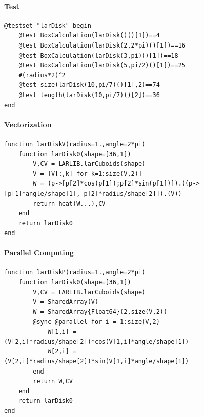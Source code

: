 \documentclass{article}
\begin{document}
\paragraph{Test}

\begin{Verbatim}
@testset "larDisk" begin
	@test BoxCalculation(larDisk()()[1])==4
	@test BoxCalculation(larDisk(2,2*pi)()[1])==16
	@test BoxCalculation(larDisk(3,pi)()[1])==18
	@test BoxCalculation(larDisk(5,pi/2)()[1])==25
	#(radius*2)^2
	@test size(larDisk(10,pi/7)()[1],2)==74
	@test length(larDisk(10,pi/7)()[2])==36
end
\end{Verbatim}

\paragraph{Vectorization}

\begin{verbatim}
function larDiskV(radius=1.,angle=2*pi)
    function larDisk0(shape=[36,1])
        V,CV = LARLIB.larCuboids(shape)
        V = [V[:,k] for k=1:size(V,2)]
        W = (p->[p[2]*cos(p[1]);p[2]*sin(p[1])]).((p->[p[1]*angle/shape[1], p[2]*radius/shape[2]]).(V))
        return hcat(W...),CV
    end
    return larDisk0    
end
\end{verbatim}

\paragraph{Parallel Computing} 

\begin{Verbatim}
function larDiskP(radius=1.,angle=2*pi)
    function larDisk0(shape=[36,1])
        V,CV = LARLIB.larCuboids(shape)
        V = SharedArray(V)
        W = SharedArray{Float64}(2,size(V,2))
        @sync @parallel for i = 1:size(V,2)
            W[1,i] = (V[2,i]*radius/shape[2])*cos(V[1,i]*angle/shape[1])
            W[2,i] = (V[2,i]*radius/shape[2])*sin(V[1,i]*angle/shape[1])
        end
        return W,CV
    end
    return larDisk0    
end
\end{Verbatim}
\end{document}
